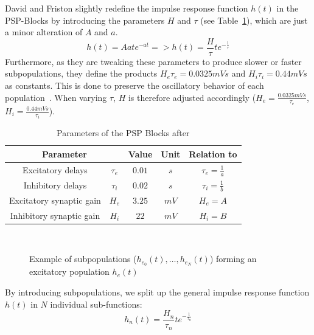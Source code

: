 David and Friston slightly redefine the impulse response function $h(t)$ in the PSP-Blocks by introducing the
parameters $H$ and $\tau$ (see Table~\ref{tab:davidfriston}),
which are just a minor alteration of $A$ and $a$.
\[ h(t)=Aate^{-at} => h(t)=\frac{H}{\tau}te^{-\frac{1}{\tau}} \]
Furthermore, as they are tweaking these parameters to produce slower or faster subpopulations,
they define the products $H_e\tau_e=0.0325mVs$ and $H_i\tau_i=0.44mVs$ as constants.
This is done to preserve the oscillatory behavior of each population~\parencite{david_neural_2003}.
When varying $\tau$, $H$ is therefore adjusted
accordingly ($H_e=\frac{0.0325mVs}{\tau_e}$, $H_i=\frac{0.44mVs}{\tau_i}$).
\begin{table}[H]
    \centering
    \begin{tabular}{ |c|c|c|c|c| }
        \hline
        \multicolumn{2}{|c|}{Parameter} & Value & Unit & Relation to \parencite{jansen_electroencephalogram_1995} \\
        \hline
        \hline
        \rule{0pt}{3ex}Excitatory delays        & \(\tau_e\) & \(0.01\) & $s$  & $ \tau_e = \frac{1}{a} $ \\[1.2ex]
        \hline
        \rule{0pt}{3ex}Inhibitory delays        & \(\tau_i\) & \(0.02\) & $s$  & $ \tau_i = \frac{1}{b} $\\[1.2ex]
        \hline
        \rule{0pt}{3ex}Excitatory synaptic gain & \(H_e\)    & \(3.25\) & $mV$ & $ H_e = A $ \\[1.2ex]
        \hline
        \rule{0pt}{3ex}Inhibitory synaptic gain & \(H_i\)    & \(22\)   & $mV$ & $ H_i = B $ \\[1.2ex]
        \hline
    \end{tabular}
    \caption{Parameters of the PSP Blocks after \parencite{david_neural_2003}}
    \label{tab:davidfriston}
\end{table}
 \\[2em]
\begin{figure}[H]
    
    \caption{Example of subpopulations ($h_{e_0}(t), \dots, h_{e_N}(t)$) forming an excitatory population $h_e(t)$}
    \label{fig:exc_subpops}
\end{figure}
By introducing subpopulations, we split up the general impulse response function $h(t)$ in $N$ individual
sub-functions:
\[h_n(t) = \frac{H_n}{\tau_n}te^{-\frac{1}{\tau_n}}\] \\[1em]

